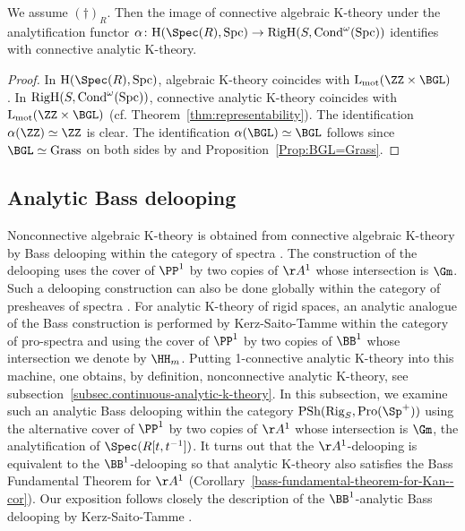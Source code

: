 \documentclass[colorinlistoftodos,article,11pt,reqno]{article}
\newcommand{\RigH}{\textup{RigH}}
\newcommand{\Rig}{\textup{Rig}}
\newcommand{\Pro}{\textup{Pro}}
\newcommand{\Cond}{\textup{Cond}}
\newcommand{\Spc}{\textup{Spc}}
\newcommand{\PSh}{\textup{PSh}}
\newcommand{\Arig}{\AA^{1}}
\newcommand{\Brig}{\BB^{1}}
\renewcommand{\to}[1][]{\overset{#1}{\rightarrow}}
\renewcommand{\L}{\textup{L}}
\newcommand{\Lmot}{\L_{\textup{mot}}}
\begin{document}
\begin{cor}
\label{cor-algebraic-analytic-K}
We assume $(\dagger)_R$. Then the image of connective algebraic K-theory under the analytification functor $\alpha \colon \textup{H}(\Spec(R),\Spc)\to\RigH(S,\Cond^\omega(\Spc))$ identifies with connective analytic K-theory.
\end{cor}
\begin{proof}
In $\textup{H}(\Spec(R),\Spc)$, algebraic K-theory coincides with $\Lmot(\ZZ\times\BGL)$ \cite[Thm.~3.13]{MV1}. In $\RigH(S,\Cond^\omega(\Spc))$, connective analytic K-theory coincides with\linebreak  $\Lmot(\ZZ\times\BGL)$ (cf. Theorem~\ref{thm:representability}). The identification $\alpha(\ZZ)\simeq\ZZ$ is clear. The identification $\alpha(\BGL)\simeq\BGL$ follows since $\BGL\simeq\textup{Grass}$ on both sides by \cite[Prop.~3.7]{MV1} and Proposition~\ref{Prop:BGL=Grass}.
\end{proof}




\subsection{Analytic Bass delooping}
\label{sec:analytic-bass-construction}
Nonconnective algebraic K-theory is obtained from connective algebraic K-theory by Bass delooping within the category of spectra \cite[\S 6]{tt90}. The construction of the delooping uses the cover of $\PP^1$ by two copies of $\Arig$ whose intersection is $\Gm$. Such a delooping construction can also be done globally within the category of presheaves of spectra \cite[\S 2]{cisinski-descente}. For analytic K-theory of rigid spaces, an analytic analogue of the Bass construction is performed by Kerz-Saito-Tamme within the category of pro-spectra and using the cover of $\PP^1$ by two copies of $\Brig$ whose intersection we denote by $\HH_m$. Putting 1-connective analytic K-theory into this machine, one obtains, by definition, nonconnective analytic K-theory, see subsection~\ref{subsec.continuous-analytic-k-theory}.
In this subsection, we examine such an analytic Bass delooping within the category $\PSh(\Rig_S,\Pro(\Sp^+))$ using the alternative cover of $\PP^1$ by two copies of $\Arig$ whose intersection is $\Gm$, the analytification of $\Spec(R[t,t^{-1}])$. It turns out that the $\Arig$-delooping is equivalent to the $\Brig$-delooping so that  analytic K-theory also satisfies the Bass Fundamental Theorem for $\Arig$ (Corollary~\ref{bass-fundamental-theorem-for-Kan--cor}). Our exposition follows closely the description of the $\Brig$-analytic Bass delooping by Kerz-Saito-Tamme \cite[\S 4.4]{kst-i}.
\end{document}

